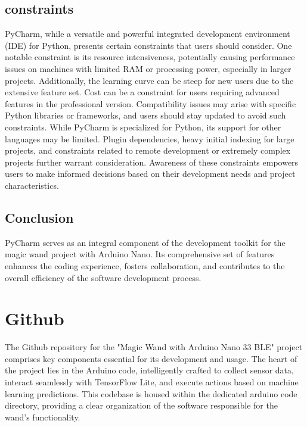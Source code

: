 \subsection{constraints}
PyCharm, while a versatile and powerful integrated development environment (IDE) for Python, presents certain constraints that users should consider. One notable constraint is its resource intensiveness, potentially causing performance issues on machines with limited RAM or processing power, especially in larger projects. Additionally, the learning curve can be steep for new users due to the extensive feature set. Cost can be a constraint for users requiring advanced features in the professional version. Compatibility issues may arise with specific Python libraries or frameworks, and users should stay updated to avoid such constraints. While PyCharm is specialized for Python, its support for other languages may be limited. Plugin dependencies, heavy initial indexing for large projects, and constraints related to remote development or extremely complex projects further warrant consideration. Awareness of these constraints empowers users to make informed decisions based on their development needs and project characteristics.
\subsection{Conclusion}
PyCharm serves as an integral component of the development toolkit for the magic wand project with Arduino Nano. Its comprehensive set of features enhances the coding experience, fosters collaboration, and contributes to the overall efficiency of the software development process.\cite{Learn:2021}

\section{Github}
The Github repository for the "Magic Wand with Arduino Nano 33 BLE" project comprises key components essential for its development and usage. The heart of the project lies in the Arduino code, intelligently crafted to collect sensor data, interact seamlessly with TensorFlow Lite, and execute actions based on machine learning predictions. This codebase is housed within the dedicated arduino code directory, providing a clear organization of the software responsible for the wand's functionality.